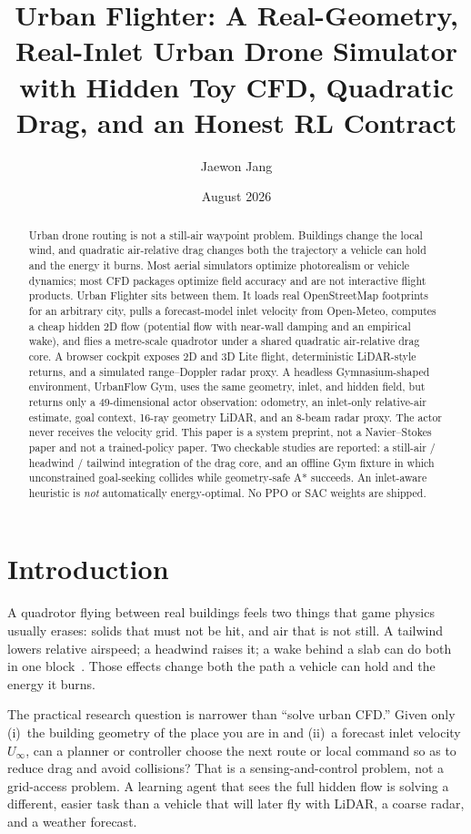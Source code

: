 \documentclass[11pt]{article}
\title{Urban Flighter: A Real-Geometry, Real-Inlet Urban Drone Simulator\\
with Hidden Toy CFD, Quadratic Drag, and an Honest RL Contract}
\author{Jaewon Jang}
\affil{Inha University}
\date{August 2026}
\begin{document}
\maketitle

\begin{abstract}
Urban drone routing is not a still-air waypoint problem.
Buildings change the local wind, and quadratic air-relative drag changes both the trajectory a vehicle can hold and the energy it burns.
Most aerial simulators optimize photorealism or vehicle dynamics; most CFD packages optimize field accuracy and are not interactive flight products.
Urban Flighter sits between them.
It loads real OpenStreetMap footprints for an arbitrary city, pulls a forecast-model inlet velocity from Open-Meteo, computes a cheap hidden 2D flow (potential flow with near-wall damping and an empirical wake), and flies a metre-scale quadrotor under a shared quadratic air-relative drag core.
A browser cockpit exposes 2D and 3D Lite flight, deterministic LiDAR-style returns, and a simulated range--Doppler radar proxy.
A headless Gymnasium-shaped environment, UrbanFlow Gym, uses the same geometry, inlet, and hidden field, but returns only a 49-dimensional actor observation: odometry, an inlet-only relative-air estimate, goal context, 16-ray geometry LiDAR, and an 8-beam radar proxy.
The actor never receives the velocity grid.
This paper is a system preprint, not a Navier--Stokes paper and not a trained-policy paper.
Two checkable studies are reported: a still-air / headwind / tailwind integration of the drag core, and an offline Gym fixture in which unconstrained goal-seeking collides while geometry-safe A* succeeds.
An inlet-aware heuristic is \emph{not} automatically energy-optimal.
No PPO or SAC weights are shipped.
\end{abstract}

\section{Introduction}

A quadrotor flying between real buildings feels two things that game physics usually erases: solids that must not be hit, and air that is not still.
A tailwind lowers relative airspeed; a headwind raises it; a wake behind a slab can do both in one block~\cite{hoffmann2007quadrotor,ware2016energy}.
Those effects change both the path a vehicle can hold and the energy it burns.

The practical research question is narrower than ``solve urban CFD.''
Given only (i)~the building geometry of the place you are in and (ii)~a forecast inlet velocity $U_\infty$, can a planner or controller choose the next route or local command so as to reduce drag and avoid collisions?
That is a sensing-and-control problem, not a grid-access problem.
A learning agent that sees the full hidden flow is solving a different, easier task than a vehicle that will later fly with LiDAR, a coarse radar, and a weather forecast.
\end{document}
